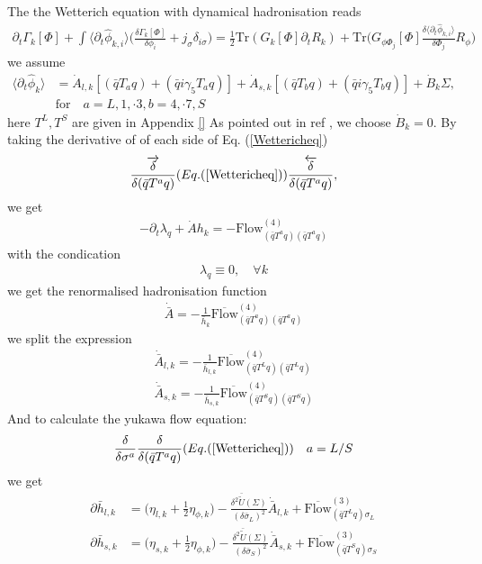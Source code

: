 \documentclass[12pt]{article}
\begin{document}
The the Wetterich equation with dynamical hadronisation reads
\begin{align}
\partial_t \Gamma_k[\Phi]+\int \langle  \partial_t  \hat \phi_{k,i}\rangle \bigg ( \frac{\delta \Gamma_k [\Phi]}{\delta \phi_i}+j_\sigma \delta_{i \sigma}\bigg )
=\frac{1}{2} \text{Tr}(G_k[\Phi] \partial_t R_k)+\text{Tr}\bigg( G_{\phi \Phi_j} [\Phi] \frac{\delta \langle  \partial_t  \hat \phi_{k,i}\rangle}{\delta \Phi_j } R_{\phi} \bigg) \label{Wettericheq}
\end{align}
we assume 
\begin{align}
\langle  \partial_t  \hat \phi_{k}\rangle&= \dot{A}_{l,k}[(\bar q T_a  q)+(\bar q i \gamma _5 T_a q)]+\dot{A}_{s,k}[(\bar q T_b  q)+(\bar q i \gamma _5 T_b q)] +\dot{B}_k \Sigma,\\
&\text{for} \quad a=L,1,\cdot 3,b=4,\cdot7, S \nonumber
\end{align}
here $T^L,T^S$ are given in Appendix \ref{}
As pointed out in ref \cite{} , we choose $\dot{B}_k =0$.
By taking the derivative of of each side of Eq. (\ref{Wettericheq})
\begin{align}
\frac{\overrightarrow{\delta}}{\delta(\bar q T^a q)}(Eq. (\ref{Wettericheq}))\frac{\overleftarrow{\delta}}{\delta (\bar q T^a q)},
\end{align}
we get
\begin{align}
- \partial_t \lambda_q + \dot{A} h_{k}=-\text{Flow} _{(\bar q T^a q) (\bar q T^a q)}^{(4)}
\end{align}
with the condication
\begin{align}
\lambda_q  \equiv 0 , \quad \forall k
\end{align}
we get the renormalised hadronisation function
\begin{align}
\dot{\bar A}=-\frac{1}{\bar h_k}\overline{  \text{Flow} }_{(\bar q T^a q) (\bar q T^a q)}^{(4)}
\end{align}
we split the expression
\begin{align}
\dot{\bar A}_{l,k}=-\frac{1}{\bar h_{l,k}}\overline{  \text{Flow} }_{(\bar q T^L q) (\bar q T^L q)}^{(4)} \\
\dot{\bar A}_{s,k}=-\frac{1}{\bar h_{s,k}}\overline{  \text{Flow} }_{(\bar q T^S q) (\bar q T^S  q)}^{(4)}
\end{align}
And to calculate the yukawa flow equation:
\begin{align}
\frac{{\delta}}{\delta \sigma^a}\frac{{\delta}}{\delta(\bar q T^a q)}(Eq. (\ref{Wettericheq})) \quad a=L/S
\end{align}
we get
\begin{align}
\partial \bar h_{l,k}&=\bigg( \eta_{l,k} +\frac{1}{2}\eta_{\phi,k}\bigg )-\frac{\delta^2 \bar {\tilde U}(\Sigma)}{(\delta \bar \sigma_L)^2}\dot{\bar A}_{l,k}+\overline{  \text{Flow} }_{(\bar q T^L q) \sigma_L}^{(3)}\\
\partial \bar h_{s,k}&=\bigg( \eta_{s,k} +\frac{1}{2}\eta_{\phi,k}\bigg )-\frac{\delta^2 \bar {\tilde U}(\Sigma)}{(\delta \bar \sigma_S)^2}\dot{\bar A}_{s,k}+\overline{  \text{Flow} }_{(\bar q T^S q) \sigma_S}^{(3)}
\end{align}
\end{document}
